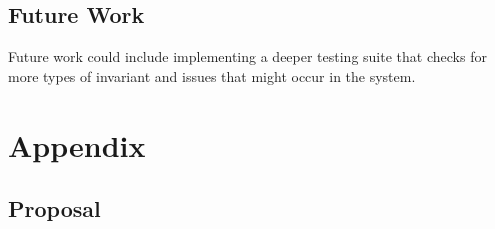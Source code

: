 \documentclass[a4paper,10pt,titlepage]{report}
\begin{document}
\section{Future Work}
Future work could include implementing a deeper testing suite that checks for more types of invariant and issues that might occur in the system.





\newpage


\chapter{Appendix}

\pagestyle{empty}
\printbibliography


\section{Proposal}




\end{document}
